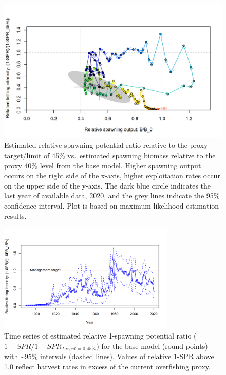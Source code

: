 \documentclass[11pt,
  english,
  a4paper,
]{article}
\begin{document}
\begin{figure}
\centering
\includegraphics[width=1\textwidth,height=0.9\textheight]{figs/SPR4_phase.png}
\caption{Estimated relative spawning potential ratio relative to the proxy target/limit of 45\% vs.~estimated spawning biomass relative to the proxy 40\% level from the base model. Higher spawning output occurs on the right side of the x-axis, higher exploitation rates occur on the upper side of the y-axis. The dark blue circle indicates the last year of available data, 2020, and the grey lines indicate the 95\% confidence interval. Plot is based on maximum likelihood estimation results.\label{fig:SPR4_phase}}
\end{figure}

\tagmcend\tagstructend


\begin{figure}
\centering
\includegraphics[width=0.75\textwidth,height=0.75\textheight]{figs/SPR3_ratiointerval.png}
\caption{Time series of estimated relative 1-spawning potential ratio ({\(1-SPR/1-SPR_{Target=0.45\%}\)\leavevmode\tagmcend\tagstructend}) for the base model (round points) with \textasciitilde95\% intervals (dashed lines). Values of relative 1-SPR above 1.0 reflect harvest rates in excess of the current overfishing proxy.\label{fig:SPR3}}
\end{figure}
\end{document}
